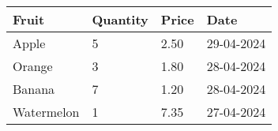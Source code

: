 \begin{tabular}{| l | l | l | l |}
	\hline	\textbf{Fruit} & \textbf{Quantity} & \textbf{Price} & \textbf{Date} \\
 	\hline
	Apple & 5 & 2.50 & 29-04-2024 \\
	\hline
	Orange & 3 & 1.80 & 28-04-2024 \\
	\hline
	Banana & 7 & 1.20 & 28-04-2024 \\
	\hline
	Watermelon & 1 & 7.35 & 27-04-2024 \\
	\hline
\end{tabular}